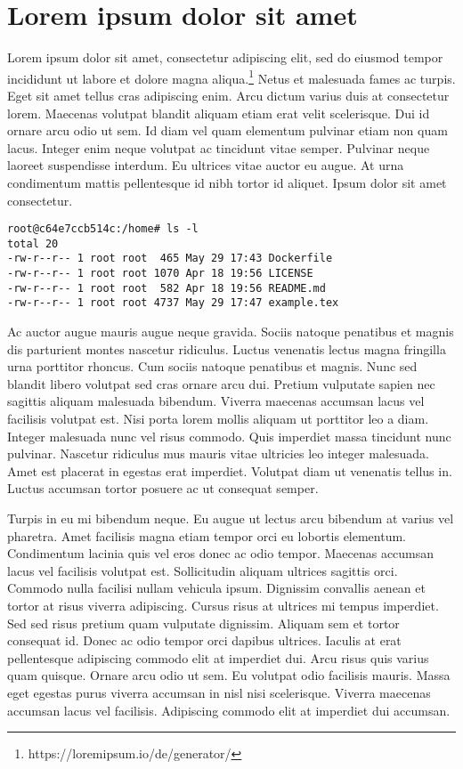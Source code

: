 \documentclass{article}
\begin{document}
\section{Lorem ipsum dolor sit amet}

Lorem ipsum dolor sit amet, consectetur adipiscing elit, sed do eiusmod tempor incididunt ut labore et dolore magna aliqua.\footnote{https://loremipsum.io/de/generator/} Netus et malesuada fames ac turpis. Eget sit amet tellus cras adipiscing enim. Arcu dictum varius duis at consectetur lorem. Maecenas volutpat blandit aliquam etiam erat velit scelerisque. Dui id ornare arcu odio ut sem. Id diam vel quam elementum pulvinar etiam non quam lacus. Integer enim neque volutpat ac tincidunt vitae semper. Pulvinar neque laoreet suspendisse interdum. Eu ultrices vitae auctor eu augue. At urna condimentum mattis pellentesque id nibh tortor id aliquet. Ipsum dolor sit amet consectetur.

\begin{verbatim}
root@c64e7ccb514c:/home# ls -l
total 20
-rw-r--r-- 1 root root  465 May 29 17:43 Dockerfile
-rw-r--r-- 1 root root 1070 Apr 18 19:56 LICENSE
-rw-r--r-- 1 root root  582 Apr 18 19:56 README.md
-rw-r--r-- 1 root root 4737 May 29 17:47 example.tex
\end{verbatim}

Ac auctor augue mauris augue neque gravida. Sociis natoque penatibus et magnis dis parturient montes nascetur ridiculus. Luctus venenatis lectus magna fringilla urna porttitor rhoncus. Cum sociis natoque penatibus et magnis. Nunc sed blandit libero volutpat sed cras ornare arcu dui. Pretium vulputate sapien nec sagittis aliquam malesuada bibendum. Viverra maecenas accumsan lacus vel facilisis volutpat est. Nisi porta lorem mollis aliquam ut porttitor leo a diam. Integer malesuada nunc vel risus commodo. Quis imperdiet massa tincidunt nunc pulvinar. Nascetur ridiculus mus mauris vitae ultricies leo integer malesuada. Amet est placerat in egestas erat imperdiet. Volutpat diam ut venenatis tellus in. Luctus accumsan tortor posuere ac ut consequat semper.

Turpis in eu mi bibendum neque. Eu augue ut lectus arcu bibendum at varius vel pharetra. Amet facilisis magna etiam tempor orci eu lobortis elementum. Condimentum lacinia quis vel eros donec ac odio tempor. Maecenas accumsan lacus vel facilisis volutpat est. Sollicitudin aliquam ultrices sagittis orci. Commodo nulla facilisi nullam vehicula ipsum. Dignissim convallis aenean et tortor at risus viverra adipiscing. Cursus risus at ultrices mi tempus imperdiet. Sed sed risus pretium quam vulputate dignissim. Aliquam sem et tortor consequat id. Donec ac odio tempor orci dapibus ultrices. Iaculis at erat pellentesque adipiscing commodo elit at imperdiet dui. Arcu risus quis varius quam quisque. Ornare arcu odio ut sem. Eu volutpat odio facilisis mauris. Massa eget egestas purus viverra accumsan in nisl nisi scelerisque. Viverra maecenas accumsan lacus vel facilisis. Adipiscing commodo elit at imperdiet dui accumsan.
\end{document}
